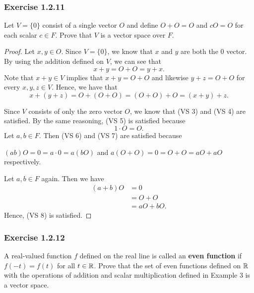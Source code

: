 \subsubsection{Exercise 1.2.11} Let \( V = \{ 0  \}  \) consist of a single vector \( O  \) and define \( O + O = O  \) and \( c O = O  \) for each scalar \( c \in F  \). Prove that \( V  \) is a vector space over \( F  \).
\begin{proof}
    Let \( x,y \in O  \). Since \( V = \{ 0  \}  \), we know that \( x  \) and \( y  \) are both the \( 0  \) vector. By using the addition defined on \( V  \), we can see that 
\[  x + y = O + O = y + x. \] 
Note that \( x + y \in V \) implies that \( x+ y = O + O  \) and  likewise \( y + z = O + O  \) for every  \( x, y, z \in V  \). Hence, we have that 
\[  x + ( y + z ) = O + (O + O) = (O+ O) + O =  (x+y) + z. \]

Since \( V  \) consists of only the zero vector \( O  \), we know that (VS 3) and (VS 4) are satisfied. By the same reasoning, (VS 5) is satisfied because 
\[  1 \cdot O = O. \]
Let \( a,b \in F  \). Then (VS 6) and (VS 7) are satisfied because 
\begin{center}
    \( (ab)O = 0 = a \cdot 0 =  a (bO)  \) and \( a ( O + O ) = 0 = O + O  =  a O + a O\) respectively.
\end{center}
Let \( a,b \in F  \) again. Then we have 
\begin{align*}
    (a+b) O &= 0  \\
            &= O + O \\
            &= a O + b O. 
\end{align*}
Hence, (VS 8) is satisfied. 
\end{proof}

\subsubsection{Exercise 1.2.12}

A real-valued function \( f  \) defined on the real line is called an \textbf{even function} if \( f(-t) = f(t)  \) for all \( t \in \mathbb{R}  \). Prove that the set of even functions defined on \( \mathbb{R}  \) with the operations of addition and scalar multiplication defined in Example 3 is a vector space.

